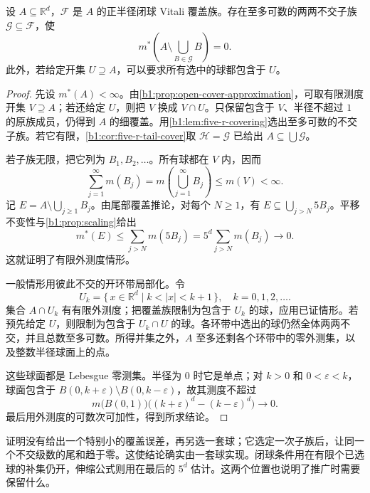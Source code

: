 \begin{theorem}
\label{b1:thm:vitali-covering-lebesgue}
设 \(A\subseteq\mathbb R^d\)，\(\mathcal F\) 是 \(A\) 的正半径闭球 Vitali 覆盖族。存在至多可数的两两不交子族 \(\mathcal G\subseteq\mathcal F\)，使
\[
m^*\left(A\setminus\bigcup_{B\in\mathcal G}B\right)=0.
\]
此外，若给定开集 \(U\supseteq A\)，可以要求所有选中的球都包含于 \(U\)。
\end{theorem}
\begin{proof}
先设 \(m^*(A)<\infty\)。由\cref{b1:prop:open-cover-approximation}，可取有限测度开集 \(V\supseteq A\)；若还给定 \(U\)，则把 \(V\) 换成 \(V\cap U\)。只保留包含于 \(V\)、半径不超过 \(1\) 的原族成员，仍得到 \(A\) 的细覆盖。用\cref{b1:lem:five-r-covering}选出至多可数的不交子族。若它有限，\cref{b1:cor:five-r-tail-cover}取 \(\mathcal H=\mathcal G\) 已给出 \(A\subseteq\bigcup\mathcal G\)。

若子族无限，把它列为 \(B_1,B_2,\ldots\)。所有球都在 \(V\) 内，因而
\[
\sum_{j=1}^{\infty}m(B_j)
=m\left(\bigcup_{j=1}^{\infty}B_j\right)
\leq m(V)<\infty.
\]
记 \(E=A\setminus\bigcup_{j\geq1}B_j\)。由尾部覆盖推论，对每个 \(N\geq1\)，有 \(E\subseteq\bigcup_{j>N}5B_j\)。平移不变性与\cref{b1:prop:scaling}给出
\[
m^*(E)
\leq\sum_{j>N}m(5B_j)
=5^d\sum_{j>N}m(B_j)
\longrightarrow0.
\]
这就证明了有限外测度情形。

一般情形用彼此不交的开环带局部化。令
\[
U_k=\{\,x\in\mathbb R^d\mid k<|x|<k+1\,\},
\quad k=0,1,2,\ldots.
\]
集合 \(A\cap U_k\) 有有限外测度；把覆盖族限制为包含于 \(U_k\) 的球，应用已证情形。若预先给定 \(U\)，则限制为包含于 \(U_k\cap U\) 的球。各环带中选出的球仍然全体两两不交，并且总数至多可数。所得并集之外，\(A\) 至多还剩各个环带中的零外测集，以及整数半径球面上的点。

这些球面都是 Lebesgue 零测集。半径为 \(0\) 时它是单点；对 \(k>0\) 和 \(0<\varepsilon<k\)，球面包含于
\(B(0,k+\varepsilon)\setminus B(0,k-\varepsilon)\)，故其测度不超过
\[
m\bigl(B(0,1)\bigr)
\bigl((k+\varepsilon)^d-(k-\varepsilon)^d\bigr)
\longrightarrow0.
\]
最后用外测度的可数次可加性，得到所求结论。
\end{proof}

证明没有给出一个特别小的覆盖误差，再另选一套球；它选定一次子族后，让同一个不交级数的尾和趋于零。这使结论确实由一套球实现。闭球条件用在有限个已选球的补集仍开，伸缩公式则用在最后的 \(5^d\) 估计。这两个位置也说明了推广时需要保留什么。

